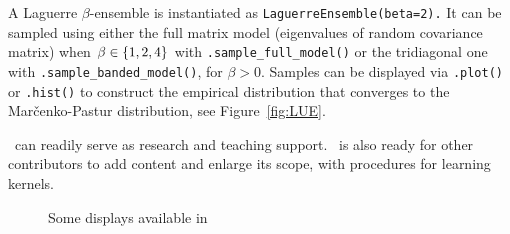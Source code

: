 \documentclass[twoside,11pt]{article}
\begin{document}
    A Laguerre $\beta$-ensemble is instantiated as
    \lstinline{LaguerreEnsemble(beta=2).}
    It can be sampled using either the full matrix model (eigenvalues of random covariance matrix) when $\beta\in\left\{ 1,2,4 \right\}$ with
    \lstinline{.sample_full_model()}
    or the tridiagonal one with
    \lstinline{.sample_banded_model()}, for $\beta > 0$.
    Samples can be displayed via
    \lstinline{.plot()} or
    \lstinline{.hist()} to construct the empirical distribution that converges to the Mar\v{c}enko-Pastur distribution, see Figure~\ref{fig:LUE}.

    \DPPy\ can readily serve as research and teaching support.
    \DPPy\ is also ready for other contributors to add content and enlarge its scope, \eg with procedures for learning kernels.

    \begin{figure}[!hb]
        \vspace{-0.5em}
        \centering
        \vspace{-0.75em}
        \caption{Some displays available in \DPPy}
        \label{fig:DPPy_figs}
        \vspace{-10em}
    \end{figure}
\end{document}
